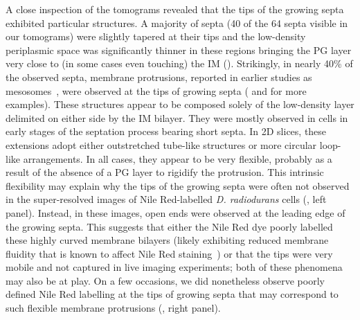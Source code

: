 A close inspection of the tomograms revealed that the tips of the growing septa exhibited particular structures.
A majority of septa (40 of the 64 septa visible in our tomograms) were slightly tapered at their tips and the low-density periplasmic space was significantly thinner in these regions bringing the PG layer very close to (in some cases even touching) the IM ().
Strikingly, in nearly 40\% of the observed septa, membrane protrusions, reported in earlier studies as mesosomes~\cite{thornleyFineStructureMicrococcus1965,sleytrStudyFreezeetchingFine1973}, were observed at the tips of growing septa ( and  for more examples).
These structures appear to be composed solely of the low-density layer delimited on either side by the IM bilayer.
They were mostly observed in cells in early stages of the septation process bearing short septa.
In 2D slices, these extensions adopt either outstretched tube-like structures or more circular loop-like arrangements.
In all cases, they appear to be very flexible, probably as a result of the absence of a PG layer to rigidify the protrusion.
This intrinsic flexibility may explain why the tips of the growing septa were often not observed in the super-resolved images of Nile Red-labelled \textit{D. radiodurans} cells (, left panel).
Instead, in these images, open ends were observed at the leading edge of the growing septa.
This suggests that either the Nile Red dye poorly labelled these highly curved membrane bilayers (likely exhibiting reduced membrane fluidity that is known to affect Nile Red staining~\cite{strahlActinHomologueMreB2014}) or that the tips were very mobile and not captured in live imaging experiments; both of these phenomena may also be at play.
On a few occasions, we did nonetheless observe poorly defined Nile Red labelling at the tips of growing septa that may correspond to such flexible membrane protrusions (, right panel).

